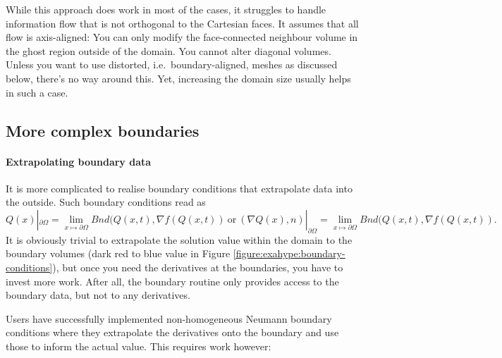 While this approach does work in most of the cases, it struggles to handle
information flow that is not orthogonal to the Cartesian faces.
It assumes that all flow is axis-aligned:
You can only modify the face-connected neighbour volume in the ghost 
region outside of the domain.
You cannot alter diagonal volumes.
Unless you want to use distorted, i.e.~boundary-aligned, meshes as discussed
below, there's no way around this.
Yet, increasing the domain size usually helps in such a case.



\subsection{More complex boundaries}

\paragraph{Extrapolating boundary data}
%
%
%
It is more complicated to realise boundary conditions that extrapolate
data into the outside.
Such boundary conditions read as
\[
  Q(x) | _{\partial \Omega } = \lim _{x \mapsto \partial \Omega}
  Bnd(Q(x,t),\nabla f(Q(x,t))
  \ \text{or} \
  \left( \nabla Q(x), n \right) | _{\partial \Omega } = \lim _{x \mapsto
  \partial \Omega} Bnd(Q(x,t),\nabla f(Q(x,t)).
\]
It is obviously trivial to extrapolate the solution value within the domain to
the boundary volumes (dark red to blue value in Figure
\ref{figure:exahype:boundary-conditions}), but once you need the derivatives at
the boundaries, you have to invest more work.
After all, the boundary routine only provides access to the boundary data, but
not to any derivatives.


Users have successfully implemented non-homogeneous Neumann boundary
conditions where they extrapolate the derivatives onto the boundary and use
those to inform the actual value.
This requires work however:

